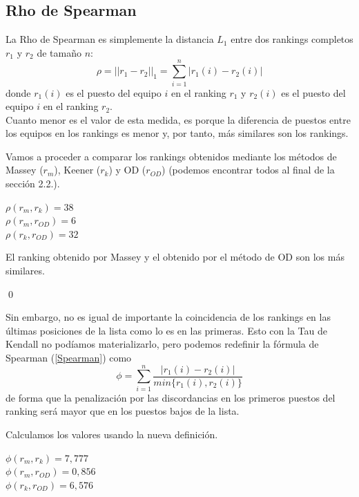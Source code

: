 \subsection{Rho de Spearman}
La Rho de Spearman es simplemente la distancia $L_{1}$ entre dos rankings completos $r_{1}$ y $r_{2}$ de tamaño $n$:
\begin{equation} \label{Spearman}
	\rho = ||r_{1} - r_{2}||_{1}= \sum_{i=1}^{n} |r_{1}(i) - r_{2}(i)|
\end{equation}
donde $r_{1}(i)$ es el puesto del equipo $i$ en el ranking $r_{1}$ y $r_{2}(i)$ es el puesto del equipo $i$ en el ranking $r_{2}$. \\

Cuanto menor es el valor de esta medida, es porque la diferencia de puestos entre los equipos en los rankings es menor y, por tanto, más similares son los rankings.
\begin{ejem} Vamos a proceder a comparar los rankings obtenidos mediante los métodos de Massey ($r_{m}$), Keener ($r_{k}$) y OD ($r_{OD}$) (podemos encontrar todos al final de la sección 2.2.).
\end{ejem}
	\begin{center}
		$ \rho (r_{m},r_{k}) = 38$\\
		$ \rho (r_{m},r_{OD}) = 6$\\
		$ \rho (r_{k},r_{OD}) = 32$
	\end{center}
	
	El ranking obtenido por Massey y el obtenido por el método de OD son los más similares.
	
\qed

Sin embargo, no es igual de importante la coincidencia de los rankings en las últimas posiciones de la lista como lo es en las primeras. Esto con la Tau de Kendall no podíamos materializarlo, pero podemos redefinir la fórmula de Spearman (\ref{Spearman}) como 
\begin{equation}
	\phi = \sum_{i=1}^{n} \dfrac{|r_{1}(i) - r_{2}(i)|}{min\{r_{1}(i),r_{2}(i)\}}
\end{equation}
de forma que la penalización por las discordancias en los primeros puestos del ranking será mayor que en los puestos bajos de la lista. 

\begin{ejem} Calculamos los valores usando la nueva definición.
\end{ejem}	
	\begin{center}
		$ \phi (r_{m},r_{k}) = 7,777$\\
		$ \phi (r_{m},r_{OD}) = 0,856$\\
		$ \phi (r_{k},r_{OD}) = 6,576$ 
	\end{center}
	
